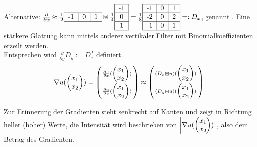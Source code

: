 Alternative: $\frac{\partial }{\partial x} \approx \frac{1}{2} \begin{tabular}{|c|c|c|}\hline
    -1 & 0 & 1\\
    \hline
\end{tabular} \boxast \frac{1}{4}\begin{tabular}{|c|c|c|}\hline
    -1\\
    \hline
    0\\
    \hline
    1\\
    \hline
\end{tabular} = \frac{1}{8} \begin{tabular}{|c|c|c|}\hline
-1 & 0 & 1\\
\hline
-2 & 0 & 2\\
\hline
-1 & 0 & 1\\
\hline
\end{tabular}=:D_x$, genannt .
Eine stärkere Glättung kann mittels anderer vertikaler Filter mit Binomialkoeffizienten erzeilt werden.\\

Entsprechen wird $\frac{\partial }{\partial y} D_y:=D_x^T$ definiert.\\

\begin{equation}\label{eq:6.2}
    \nabla u(\begin{pmatrix} x_1 \cr x_2 \end{pmatrix}) = \left( \begin{smallmatrix} \frac{\partial u}{\partial x}(\begin{pmatrix} x_1 \cr x_2 \end{pmatrix})\\\frac{\partial u}{\partial y}(\begin{pmatrix} x_1 \cr x_2 \end{pmatrix}) \end{smallmatrix} \right) \approx \left( \begin{smallmatrix} (D_x \boxast u)(\begin{pmatrix} x_1 \cr x_2 \end{pmatrix})\\ (D_y \boxast u)(\begin{pmatrix} x_1 \cr x_2 \end{pmatrix}) \end{smallmatrix} \right)
\end{equation}

Zur Erinnerung der Gradienten steht senkrecht auf Kanten und zeigt in Richtung heller (hoher) Werte, die Intensität wird beschrieben von $\left\lvert \nabla u(\begin{pmatrix} x_1 \cr x_2 \end{pmatrix}) \right\rvert$, also dem Betrag des Gradienten.

